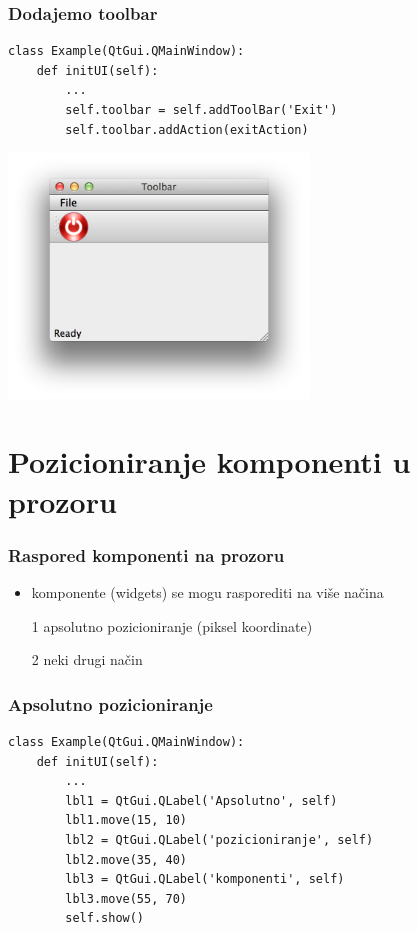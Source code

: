 \documentclass[utf8,compress]{beamer}
\begin{document}
\begin{frame}[fragile]
  \frametitle{Dodajemo toolbar}
\begin{verbatim}
class Example(QtGui.QMainWindow):
    def initUI(self):
        ...
        self.toolbar = self.addToolBar('Exit')
        self.toolbar.addAction(exitAction)        
\end{verbatim}
\begin{center}
\includegraphics[width=8cm]{pyqt04.png}
\end{center}
\end{frame}

\section[Pozicioniranje]{Pozicioniranje komponenti u prozoru}

\begin{frame}[fragile]
  \frametitle{Raspored komponenti na prozoru}
  \begin{itemize}
    \item komponente (widgets) se mogu rasporediti na više načina
    \item[1] apsolutno pozicioniranje (piksel koordinate)
    \item[2] neki drugi način
  \end{itemize}
\end{frame}

\begin{frame}[fragile]
  \frametitle{Apsolutno pozicioniranje}
\begin{verbatim}
class Example(QtGui.QMainWindow):
    def initUI(self):
        ...
        lbl1 = QtGui.QLabel('Apsolutno', self)
        lbl1.move(15, 10)
        lbl2 = QtGui.QLabel('pozicioniranje', self)
        lbl2.move(35, 40)
        lbl3 = QtGui.QLabel('komponenti', self)
        lbl3.move(55, 70)        
        self.show()
\end{verbatim}
\end{frame}
\end{document}
